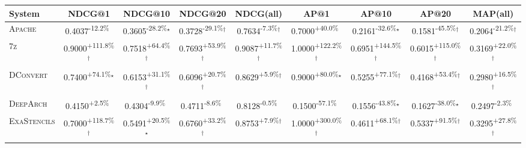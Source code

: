 \begin{table}[htbp]
\centering
\renewcommand{\arraystretch}{1.2}
\begin{tabular}{l|cccc|cccc}
\hline
System & NDCG@1 & NDCG@10 & NDCG@20 & NDCG(all) & AP@1 & AP@10 & AP@20 & MAP(all) \\ \hline
\textsc{Apache} & \cellcolor{red!30}0.4037\textsuperscript{-12.2\%}$^{\,\,\,}$ & \cellcolor{red!30}0.3605\textsuperscript{-28.2\%}$^\star$ & \cellcolor{red!30}0.3728\textsuperscript{-29.1\%}$^\dagger$ & \cellcolor{red!30}0.7634\textsuperscript{-7.3\%}$^\dagger$ & \cellcolor{green!30}0.7000\textsuperscript{+40.0\%}$^{\,\,\,}$ & \cellcolor{red!30}0.2161\textsuperscript{-32.6\%}$^\star$ & \cellcolor{red!30}0.1581\textsuperscript{-45.5\%}$^\dagger$ & \cellcolor{red!30}0.2064\textsuperscript{-21.2\%}$^\dagger$ \\
\textsc{7z} & \cellcolor{green!30}0.9000\textsuperscript{+111.8\%}$^\dagger$ & \cellcolor{green!30}0.7518\textsuperscript{+64.4\%}$^\dagger$ & \cellcolor{green!30}0.7693\textsuperscript{+53.9\%}$^\dagger$ & \cellcolor{green!30}0.9087\textsuperscript{+11.7\%}$^\dagger$ & \cellcolor{green!30}1.0000\textsuperscript{+122.2\%}$^\dagger$ & \cellcolor{green!30}0.6951\textsuperscript{+144.5\%}$^\dagger$ & \cellcolor{green!30}0.6015\textsuperscript{+115.0\%}$^\dagger$ & \cellcolor{green!30}0.3169\textsuperscript{+22.0\%}$^\dagger$ \\
\textsc{DConvert} & \cellcolor{green!30}0.7400\textsuperscript{+74.1\%}$^\star$ & \cellcolor{green!30}0.6153\textsuperscript{+31.1\%}$^\dagger$ & \cellcolor{green!30}0.6096\textsuperscript{+20.7\%}$^\dagger$ & \cellcolor{green!30}0.8629\textsuperscript{+5.9\%}$^\dagger$ & \cellcolor{green!30}0.9000\textsuperscript{+80.0\%}$^\star$ & \cellcolor{green!30}0.5255\textsuperscript{+77.1\%}$^\dagger$ & \cellcolor{green!30}0.4168\textsuperscript{+53.4\%}$^\dagger$ & \cellcolor{green!30}0.2980\textsuperscript{+16.5\%}$^\dagger$ \\
\textsc{DeepArch} & \cellcolor{green!30}0.4150\textsuperscript{+2.5\%}$^{\,\,\,}$ & \cellcolor{red!30}0.4304\textsuperscript{-9.9\%}$^{\,\,\,}$ & \cellcolor{red!30}0.4711\textsuperscript{-8.6\%}$^{\,\,\,}$ & \cellcolor{red!30}0.8128\textsuperscript{-0.5\%}$^{\,\,\,}$ & \cellcolor{red!30}0.1500\textsuperscript{-57.1\%}$^{\,\,\,}$ & \cellcolor{red!30}0.1556\textsuperscript{-43.8\%}$^\star$ & \cellcolor{red!30}0.1627\textsuperscript{-38.0\%}$^\star$ & \cellcolor{red!30}0.2497\textsuperscript{-2.3\%}$^{\,\,\,}$ \\
\textsc{ExaStencils} & \cellcolor{green!30}0.7000\textsuperscript{+118.7\%}$^\dagger$ & \cellcolor{green!30}0.5491\textsuperscript{+20.5\%}$^\star$ & \cellcolor{green!30}0.6760\textsuperscript{+33.2\%}$^\dagger$ & \cellcolor{green!30}0.8753\textsuperscript{+7.9\%}$^\dagger$ & \cellcolor{green!30}1.0000\textsuperscript{+300.0\%}$^\dagger$ & \cellcolor{green!30}0.4611\textsuperscript{+68.1\%}$^\dagger$ & \cellcolor{green!30}0.5337\textsuperscript{+91.5\%}$^\dagger$ & \cellcolor{green!30}0.3295\textsuperscript{+27.8\%}$^\dagger$ \\

\end{tabular}
\end{table}
